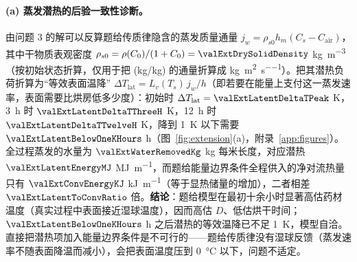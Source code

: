 \paragraph{(a) 蒸发潜热的后验一致性诊断。} 由问题 3 的解可以反算题给传质律隐含的蒸发质量通量 $j_w=\rho_{s0}h_m(C_s-C_{\mathrm{air}})$，其中干物质表观密度 $\rho_{s0}=\rho(C_0)/(1+C_0)=\valExtDrySolidDensity$ \si{\kilo\gram\per\cubic\meter}（按初始状态折算，仅用于把 (kg/kg) 的通量折算成 \si{\kilo\gram\per\square\meter\per\second}）。把其潜热负荷折算为“等效表面温降” $\Delta T_{\mathrm{lat}}=L_v(T_s)\,j_w/h$（即若要在能量上支付这一蒸发速率，表面需要比烘房低多少度）：初始时 $\Delta T_{\mathrm{lat}}=\valExtLatentDeltaTPeak$ \si{\kelvin}，\SI{3}{\hour} 时 $\valExtLatentDeltaTThreeH$ \si{\kelvin}，\SI{12}{\hour} 时 $\valExtLatentDeltaTTwelveH$ \si{\kelvin}，降到 \SI{1}{\kelvin} 以下需要 $\valExtLatentBelowOneKHours$ h（图~\ref{fig:extension}(a)，附录~\ref{app:figures}）。全过程蒸发的水量为 $\valExtWaterRemovedKg$ \si{\kilo\gram} 每米长度，对应潜热 $\valExtLatentEnergyMJ$ \si{\mega\joule\per\meter}，而题给能量边界条件全程供入的净对流热量只有 $\valExtConvEnergyKJ$ \si{\kilo\joule\per\meter}（等于显热储量的增加），二者相差 $\valExtLatentToConvRatio$ 倍。\textbf{结论}：题给模型在最初十余小时显著高估药材温度（真实过程中表面接近湿球温度），因而高估 $D$、低估烘干时间；$\valExtLatentBelowOneKHours$ h 之后潜热的等效温降已不足 \SI{1}{\kelvin}，模型自洽。直接把潜热项加入能量边界条件是不可行的——题给传质律没有湿球反馈（蒸发速率不随表面降温而减小），会把表面温度压到 \SI{0}{\celsius} 以下，问题不适定。

